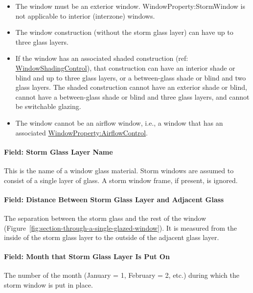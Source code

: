 \begin{itemize}
\item
  The window must be an exterior window. WindowProperty:StormWindow is not applicable to interior (interzone) windows.
\item
  The window construction (without the storm glass layer) can have up to three glass layers.
\item
  If the window has an associated shaded construction (ref: \hyperref[windowpropertyshadingcontrol]{WindowShadingControl}), that construction can have an interior shade or blind and up to three glass layers, or a between-glass shade or blind and two glass layers. The shaded construction cannot have an exterior shade or blind, cannot have a between-glass shade or blind and three glass layers, and cannot be switchable glazing.
\item
  The window cannot be an airflow window, i.e., a window that has an associated \hyperref[windowpropertyairflowcontrol]{WindowProperty:AirflowControl}.
\end{itemize}

\paragraph{Field: Storm Glass Layer Name}\label{field-storm-glass-layer-name}

This is the name of a window glass material. Storm windows are assumed to consist of a single layer of glass. A storm window frame, if present, is ignored.

\paragraph{Field: Distance Between Storm Glass Layer and Adjacent Glass}\label{field-distance-between-storm-glass-layer-and-adjacent-glass}

The separation between the storm glass and the rest of the window (Figure~\ref{fig:section-through-a-single-glazed-window}). It is measured from the inside of the storm glass layer to the outside of the adjacent glass layer.

\paragraph{Field: Month that Storm Glass Layer Is Put On}\label{field-month-that-storm-glass-layer-is-put-on}

The number of the month (January = 1, February = 2, etc.) during which the storm window is put in place.

